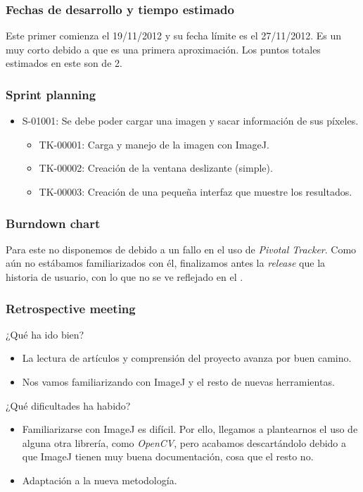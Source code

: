 \subsubsection*{Fechas de desarrollo y tiempo estimado}
Este primer \sprint{} comienza el 19/11/2012 y su fecha límite es el 27/11/2012. Es un \sprint{} muy corto debido a que es una primera aproximación. Los puntos totales estimados en este \sprint{} son de 2.

\subsubsection*{Sprint planning}
\begin{itemize}
\item  S-01001: Se debe poder cargar una imagen y sacar información de sus píxeles.
	\begin{itemize}
	\item TK-00001: Carga y manejo de la imagen con ImageJ.
	\item TK-00002: Creación de la ventana deslizante (simple).
	\item TK-00003: Creación de una pequeña interfaz que muestre los resultados.
	\end{itemize}
\end{itemize}

\subsubsection*{Burndown chart}
Para este \sprint{} no disponemos de \burndownchart{} debido a un fallo en el uso de \textit{Pivotal Tracker}. Como aún no estábamos familiarizados con él, finalizamos antes la \textit{release} que la historia de usuario, con lo que no se ve reflejado en el \burndownchart{}.

\subsubsection*{Retrospective meeting}
¿Qué ha ido bien?
\begin{itemize}
 \item La lectura de artículos y comprensión del proyecto avanza por buen camino.
 \item Nos vamos familiarizando con ImageJ y el resto de nuevas herramientas.
\end{itemize}

¿Qué dificultades ha habido?
\begin{itemize}
 \item Familiarizarse con ImageJ es difícil. Por ello, llegamos a plantearnos el uso de alguna otra librería, como \textit{OpenCV}, pero acabamos descartándolo debido a que ImageJ tienen muy buena documentación, cosa que el resto no.
 \item Adaptación a la nueva metodología.
\end{itemize}


